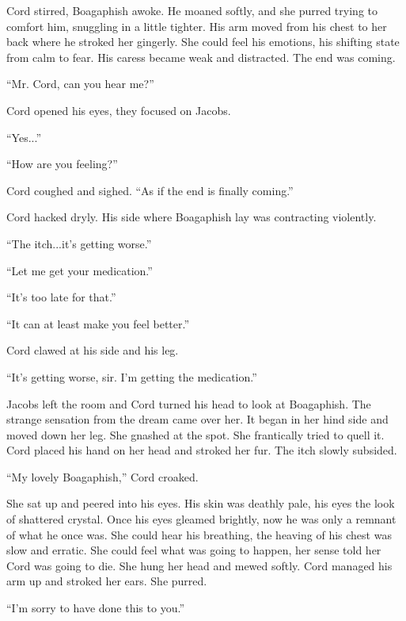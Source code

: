 Cord stirred, Boagaphish awoke. He moaned softly, and she purred trying
to comfort him, snuggling in a little tighter. His arm moved from his
chest to her back where he stroked her gingerly. She could feel his
emotions, his shifting state from calm to fear. His caress became weak
and distracted. The end was coming.

``Mr. Cord, can you hear me?''

Cord opened his eyes, they focused on Jacobs.

``Yes...''

``How are you feeling?''

Cord coughed and sighed. ``As if the end is finally coming.''

Cord hacked dryly. His side where Boagaphish lay was contracting
violently.

``The itch...it's getting worse.''

``Let me get your medication.''

``It's too late for that.''

``It can at least make you feel better.''

Cord clawed at his side and his leg.

``It's getting worse, sir. I'm getting the medication.''

Jacobs left the room and Cord turned his head to look at Boagaphish. The
strange sensation from the dream came over her. It began in her hind
side and moved down her leg. She gnashed at the spot. She frantically
tried to quell it. Cord placed his hand on her head and stroked her fur.
The itch slowly subsided.

``My lovely Boagaphish,'' Cord croaked.

She sat up and peered into his eyes. His skin was deathly pale, his eyes
the look of shattered crystal. Once his eyes gleamed brightly, now he
was only a remnant of what he once was. She could hear his breathing,
the heaving of his chest was slow and erratic. She could feel what was
going to happen, her sense told her Cord was going to die. She hung her
head and mewed softly. Cord managed his arm up and stroked her ears. She
purred.

``I'm sorry to have done this to you.''

